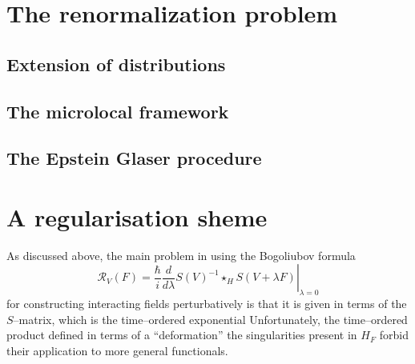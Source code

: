 \documentclass[10pt]{book}
\theoremstyle{break}
\begin{document}
 

\chapter{The renormalization problem}


\section{Extension of distributions}


\section{The microlocal framework}

\section{The Epstein Glaser procedure}


\chapter{A regularisation sheme}



As discussed above, the main problem in using the Bogoliubov formula %
\[
\mathcal{R}_V(F) = \left. \frac{\hbar}{i}\frac{d}{d\lambda} S(V)^{-1}\star_H S(V+\lambda F) \right|_{\lambda = 0}
\]
for constructing interacting fields perturbatively is that it is given in terms of the $S$--matrix, which is the time--ordered exponential %
Unfortunately, the time--ordered product defined in terms of a ``deformation'' %
the singularities present in $H_F$ forbid their application to more general functionals. 
\end{document}
